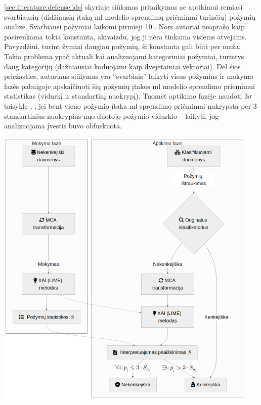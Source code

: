 \noindent
\begin{minipage}{0.45\textwidth}
    \hspace{1cm}
    \ref{sec:literature:defense:ids} skyriuje siūlomas \LIME pritaikymas \gls{ae} aptikimui remiasi svarbiausių (didžiausią įtaką \gls{ml} modelio sprendimų priėmimui turinčių) požymių analize. Svarbiausi požymiai laikomi pirmieji 10 \cite{tcydenovaDetectionAdversarialAttacks2021}. Nors autoriai neaprašo kaip pasirenkama tokia konstanta, akivaizdu, jog ji nėra tinkama visiems atvejams. Pavyzdžiui, turint žymiai daugiau požymių, ši konstanta gali būti per maža. Tokia problema ypač aktuali kai analizuojami kategoriniai požymiai, turintys daug kategorijų (dažniausiai koduojami kaip dvejetainiai vektoriai). Dėl šios priežasties, autoriaus siūlymas yra \enquote{svarbiais} laikyti visus požymius ir mokymo fazės pabaigoje apskaičiuoti šių požymių įtakos \gls{ml} modelio sprendimo priėmimui statistikas (vidurkį ir standartinį nuokrypį). Tuomet aptikimo fazėje naudoti $3 \sigma$ taisyklę \cite{pukelsheimThreeSigmaRule1994}, \ty, jei bent vieno požymio įtaka \gls{ml} sprendimo priėmimui nukrypsta per 3 standartinius nuokrypius nuo duotojo požymio vidurkio -- laikyti, jog analizuojama įvestis buvo obfuskuota.
\end{minipage}
\hspace{0.02\textwidth}
\begin{minipage}{0.58\textwidth}
    \includegraphics[width=0.95\textwidth]{images/original.png}
    \label{fig:original}
\end{minipage}

